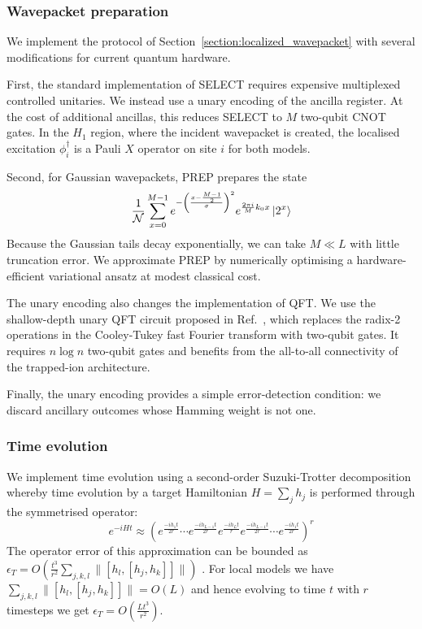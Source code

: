 \documentclass[aps,floatfix,10pt,amssymb,amsfont,amsmath,superscriptaddress,float,nofootinbib,longbibliography,nobalancelastpage,twocolumn]{revtex4-2}
\begin{document}
\subsubsection{Wavepacket preparation}
We implement the protocol of Section~\ref{section:localized_wavepacket} with several modifications for current quantum hardware.

First, the standard implementation of \textsc{SELECT} requires expensive multiplexed controlled unitaries. We instead use a unary encoding of the ancilla register. At the cost of additional ancillas, this reduces \textsc{SELECT} to $M$ two-qubit \textsc{CNOT} gates. In the $H_1$ region, where the incident wavepacket is created, the localised excitation $\phi_i^\dagger$ is a Pauli $X$ operator on site $i$ for both models.

Second, for Gaussian wavepackets, \textsc{PREP} prepares the state
\begin{equation}
    \frac{1}{\mathcal{N}}\sum_{x=0}^{M-1}e^{-\left(\frac{x-\frac{M-1}{2}}{\sigma}\right)^2}e^{\frac{2\pi i}{M}k_0 x} \ket{2^x}
\end{equation}
Because the Gaussian tails decay exponentially, we can take $M\ll L$ with little truncation error. We approximate \textsc{PREP} by numerically optimising a hardware-efficient variational ansatz at modest classical cost.

The unary encoding also changes the implementation of \textsc{QFT}. We use the shallow-depth unary QFT circuit proposed in Ref.~\cite{jain2024quantum}, which replaces the radix-2 operations in the Cooley-Tukey fast Fourier transform \cite{cooleytukey} with two-qubit gates. It requires $n\log n$ two-qubit gates and benefits from the all-to-all connectivity of the trapped-ion architecture. 

Finally, the unary encoding provides a simple error-detection condition: we discard ancillary outcomes whose Hamming weight is not one.

\subsubsection{Time evolution}
We implement time evolution using a second-order Suzuki-Trotter decomposition \cite{suzuki1976generalized, suzuki1991general} whereby time evolution by a target Hamiltonian $H=\sum_j h_j$ is performed through the symmetrised operator:
\begin{equation}
   e^{-iHt} \approx \left(e^{\frac{ -ih_1 t}{2r}}\cdots e^{\frac{ -ih_{L-1} t}{2r}}e^{\frac{ -ih_L t}{r}} e^{\frac{ -ih_{L-1} t}{2r}}\cdots e^{\frac{ -ih_1 t}{2r}}\right)^r
\end{equation}
The operator error of this approximation can be bounded as $\epsilon_T=O\left(\frac{t^3}{r^2}\sum_{j,k,l}\|[h_l,[h_j,h_k]]\|\right)$ \cite{childs2021theory}. For local models we have $\sum_{j,k,l}\|[h_l,[h_j,h_k]]\|=O(L)$ and hence evolving to time $t$ with $r$ timesteps we get $\epsilon_T=O\left(\frac{L t^3}{r^2}\right)$.
\end{document}
